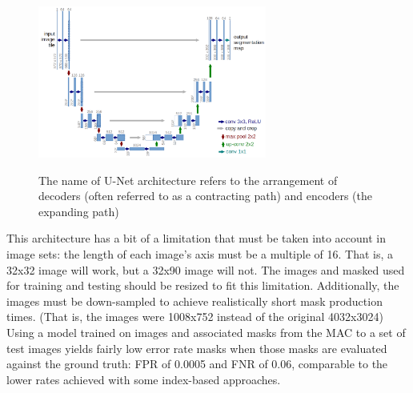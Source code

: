 \documentclass[letterpaper]{report}
\begin{document}
{\begin{figure}[H]
	\centering
	\includegraphics[height=5cm]{figures/u-net-architecture.png}
	\label{fig:u-net}
	\caption[U-Net architecture]{The name of U-Net architecture refers to the arrangement of decoders (often referred to as a contracting path) and encoders (the expanding path)}
\end{figure}
This architecture has a bit of a limitation that must be taken into account in image sets: the length of each image's axis must be a multiple of 16. That is, a 32x32 image will work, but a 32x90 image will not. The images and masked used for training and testing should be resized to fit this limitation. Additionally, the images must be down-sampled to achieve realistically short mask production times. (That is, the images were 1008x752 instead of the original 4032x3024) Using a model trained on images and associated masks from the MAC to a set of test images yields fairly low error rate masks when  those masks are evaluated against the ground truth: \gls{FPR} of 0.0005 and \gls{FNR} of 0.06, comparable to the lower rates achieved with some index-based approaches.

}
\end{document}
